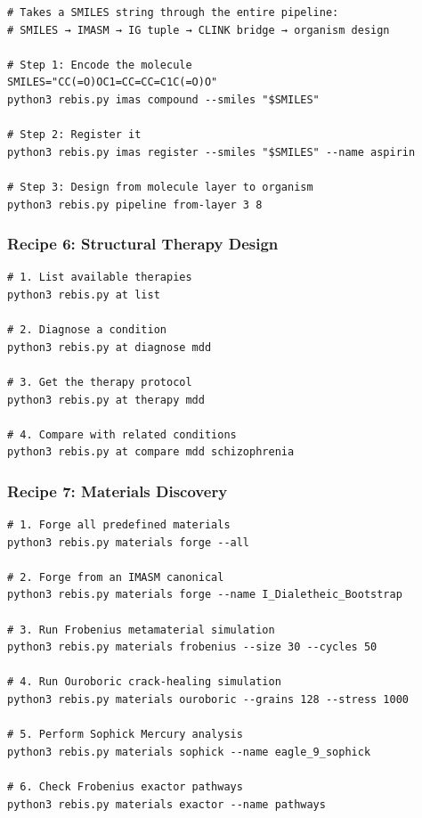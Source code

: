 \documentclass[12pt,a4paper]{article}
\begin{document}
\begin{verbatim}
# Takes a SMILES string through the entire pipeline:
# SMILES → IMASM → IG tuple → CLINK bridge → organism design

# Step 1: Encode the molecule
SMILES="CC(=O)OC1=CC=CC=C1C(=O)O"
python3 rebis.py imas compound --smiles "$SMILES"

# Step 2: Register it
python3 rebis.py imas register --smiles "$SMILES" --name aspirin

# Step 3: Design from molecule layer to organism
python3 rebis.py pipeline from-layer 3 8
\end{verbatim}

\hypertarget{recipe-6-structural-therapy-design}{%
\subsubsection{Recipe 6: Structural Therapy
Design}\label{recipe-6-structural-therapy-design}}

\begin{verbatim}
# 1. List available therapies
python3 rebis.py at list

# 2. Diagnose a condition
python3 rebis.py at diagnose mdd

# 3. Get the therapy protocol
python3 rebis.py at therapy mdd

# 4. Compare with related conditions
python3 rebis.py at compare mdd schizophrenia
\end{verbatim}

\hypertarget{recipe-7-materials-discovery}{%
\subsubsection{Recipe 7: Materials
Discovery}\label{recipe-7-materials-discovery}}

\begin{verbatim}
# 1. Forge all predefined materials
python3 rebis.py materials forge --all

# 2. Forge from an IMASM canonical
python3 rebis.py materials forge --name I_Dialetheic_Bootstrap

# 3. Run Frobenius metamaterial simulation
python3 rebis.py materials frobenius --size 30 --cycles 50

# 4. Run Ouroboric crack-healing simulation
python3 rebis.py materials ouroboric --grains 128 --stress 1000

# 5. Perform Sophick Mercury analysis
python3 rebis.py materials sophick --name eagle_9_sophick

# 6. Check Frobenius exactor pathways
python3 rebis.py materials exactor --name pathways
\end{verbatim}
\end{document}
